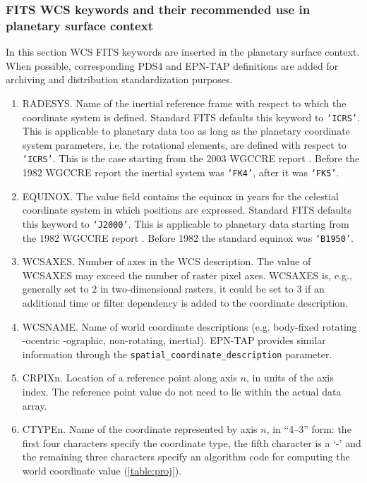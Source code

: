 \subsubsection{FITS WCS keywords and their recommended use in planetary surface context}
\label{sssec:wcskeys}
In this section WCS FITS keywords are inserted in the planetary surface context.
When possible, corresponding PDS4 and EPN-TAP definitions are added for archiving
and distribution standardization purposes.
\begin{enumerate}
\item{RADESYS.
Name of the inertial reference frame with respect to which the coordinate
system is defined. Standard FITS defaults this keyword to \texttt{`ICRS'}.
This is applicable to planetary data too as long as the planetary coordinate system
parameters, i.e. the rotational elements, are defined with respect to \texttt{`ICRS'}.
This is the case starting from the 2003 WGCCRE report \citep{wgccre2003}.
Before the 1982 WGCCRE report \citep{wgccre1982} the inertial system was \texttt{`FK4'},
after it was \texttt{`FK5'}.}
\item{EQUINOX.
The value field contains the equinox in years for the celestial
coordinate system in which positions are expressed.
Standard FITS defaults this keyword to \texttt{`J2000'}.
This is applicable to planetary data starting from the 1982 WGCCRE report \citep{wgccre1982}.
Before 1982 the standard equinox was \texttt{`B1950'}.}
\item{WCSAXES.
Number of axes in the WCS description.
The value of WCSAXES may exceed the number of raster pixel axes. WCSAXES is, e.g.,
generally set to $2$ in two-dimensional rasters, it could be set to $3$ if an
additional time or filter dependency is added to the coordinate description.}
\item{WCSNAME.
Name of world coordinate descriptions (e.g. body-fixed rotating -ocentric -ographic,
non-rotating, inertial).
EPN-TAP provides similar information through the \texttt{spatial\_coordinate\_description} parameter.}
\item{CRPIXn.
Location of a reference point along axis $n$, in units of the axis index.
The reference point value do not need to lie within the actual data array.}
\item{CTYPEn.
Name of the coordinate represented by axis $n$, in ``4--3'' form: the first four
characters specify the coordinate type, the fifth character is a `-' and the
remaining three characters specify an algorithm code for computing the world coordinate
value (\ref{table:proj}).
}
\end{enumerate}
